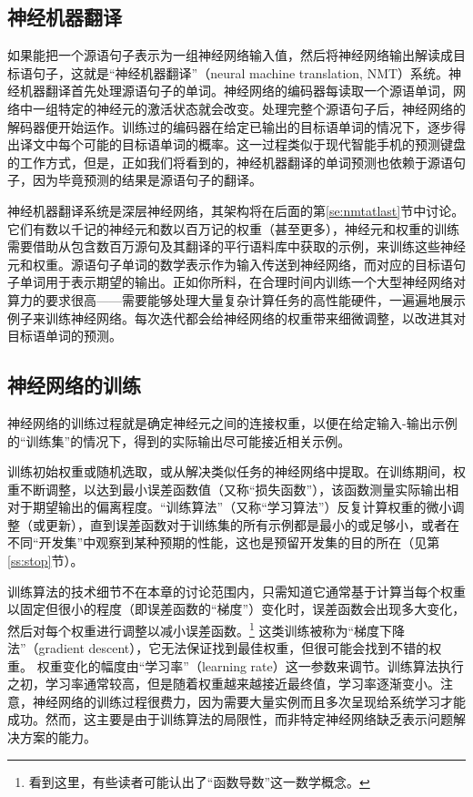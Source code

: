 \documentclass[output=paper,colorlinks,citecolor=brown]{langscibook}
\begin{document}
\subsection{神经机器翻译}
\label{ss:nmt}
如果能把一个源语句子表示为一组神经网络输入值，然后将神经网络输出解读成目标语句子，这就是“神经机器翻译”（neural machine translation, NMT）系统。神经机器翻译首先处理源语句子的单词。神经网络的编码器每读取一个源语单词，网络中一组特定的神经元的激活状态就会改变。处理完整个源语句子后，神经网络的解码器便开始运作。训练过的编码器在给定已输出的目标语单词的情况下，逐步得出译文中每个可能的目标语单词的概率。这一过程类似于现代智能手机的预测键盘的工作方式，但是，正如我们将看到的，神经机器翻译的单词预测也依赖于源语句子，因为毕竟预测的结果是源语句子的翻译。

神经机器翻译系统是深层神经网络，其架构将在后面的第\ref{se:nmtatlast}节中讨论。它们有数以千记的神经元和数以百万记的权重（甚至更多），神经元和权重的训练需要借助从包含数百万源句及其翻译的平行语料库中获取的示例，来训练这些神经元和权重。源语句子单词的数学表示作为输入传送到神经网络，而对应的目标语句子单词用于表示期望的输出。正如你所料，在合理时间内训练一个大型神经网络对算力的要求很高——需要能够处理大量复杂计算任务的高性能硬件，一遍遍地展示例子来训练神经网络。每次迭代都会给神经网络的权重带来细微调整，以改进其对目标语单词的预测。


\subsection{神经网络的训练}\label{sec:perez:3.5}
\label{ss:trainnn}

神经网络的训练过程就是确定神经元之间的连接权重，以便在给定输入-输出示例的“训练集”的情况下，得到的实际输出尽可能接近相关示例。

训练初始权重或随机选取，或从解决类似任务的神经网络中提取。在训练期间，权重不断调整，以达到最小误差函数值（又称“损失函数”），该函数测量实际输出相对于期望输出的偏离程度。“训练算法”（又称“学习算法”）反复计算权重的微小调整（或更新），直到误差函数对于训练集的所有示例都是最小的或足够小，或者在不同“开发集”中观察到某种预期的性能，这也是预留开发集的目的所在（见第\ref{ss:stop}节）。

训练算法的技术细节不在本章的讨论范围内，只需知道它通常基于计算当每个权重以固定但很小的程度（即误差函数的“梯度”）变化时，误差函数会出现多大变化，然后对每个权重进行调整以减小误差函数。\footnote{看到这里，有些读者可能认出了“函数导数”这一数学概念。} 
这类训练被称为“梯度下降法”（gradient descent），它无法保证找到最佳权重，但很可能会找到不错的权重。
权重变化的幅度由“学习率”（learning rate）这一参数来调节。训练算法执行之初，学习率通常较高，但是随着权重越来越接近最终值，学习率逐渐变小。注意，神经网络的训练过程很费力，因为需要大量实例而且多次呈现给系统学习才能成功。然而，这主要是由于训练算法的局限性，而非特定神经网络缺乏表示问题解决方案的能力。
\end{document}

